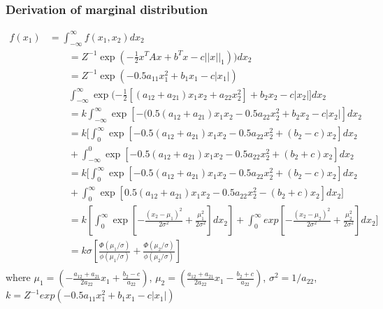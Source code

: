 \subsubsection{Derivation of marginal distribution}
$$
\begin{array}{rl}
	f(x_1)
	& =  \int_{-\infty}^{\infty} f(x_1,x_2)dx_2 \\
	& \qquad
	= Z^{-1}\exp(-\frac{1}{2}x^TAx + b^Tx - c||x||_1))dx_2 \\
	& \qquad
	= Z^{-1}\exp(-0.5a_{11}x_1^2  + b_1x_1 - c|x_1|) \\
	& \qquad
	\int_{-\infty}^{\infty}\exp(-\frac{1}{2} [(a_{12}+a_{21})x_1x_2 + a_{22}x_2^2] + b_2x_2 - c|x_2|]dx_2\\
	& \qquad
	= k \int_{-\infty}^{\infty} \exp[-(0.5(a_{12}+a_{21})x_1x_2 -0.5a_{22}x_2^2 + b_2x_2 - c|x_2|]dx_2\\
	& \qquad
	= k[ \int_{0}^{\infty} \exp[-0.5(a_{12}+a_{21})x_1x_2 - 0.5a_{22}x_2^2 + (b_2 - c)x_2 ]dx_2  \\
	& \qquad
	+\int_{-\infty}^{0} \exp[-0.5(a_{12}+a_{21})x_1x_2  - 0.5a_{22}x_2^2  + (b_2+c)x_2]dx_2 \\
	& \qquad
	= k[ \int_{0}^{\infty} \exp[-0.5(a_{12}+a_{21})x_1x_2 - 0.5a_{22}x_2^2 + (b_2 - c)x_2 ]dx_2  \\
	& \qquad
	+\int_{0}^{\infty} \exp[0.5(a_{12}+a_{21})x_1x_2  - 0.5a_{22}x_2^2  - (b_2+ c)x_2]dx_2 ]\\
	& \qquad
	= k[\int_{0}^{\infty} \exp[-\frac{(x_2-\mu_1)^2}{2\sigma^2} + \frac{\mu_1^2}{2\sigma^2}]dx_2] + \int_{0}^{\infty} exp[-\frac{(x_2-\mu_2)^2}{2\sigma^2} + \frac{\mu_2^2}{2\sigma^2}]dx_2] \\
	& \qquad
	= k \sigma[\frac{\Phi(\mu_1/\sigma)}{\phi(\mu_1/\sigma)} +
	\frac{\Phi(\mu_2/\sigma)}{\phi(\mu_2/\sigma)}]  \\
	
\end{array}
$$
where $\mu_1 = (-\frac{a_{12}+a_{21}}{2a_{22}}x_1 + \frac{b_2-c}{a_{22}}) $, $\mu_2 =(\frac{a_{12}+a_{21}}{2a_{22}}x_1 - \frac{b_2+c}{a_{22}}) $, $\sigma^2 = 1/a_{22}$, $k =  Z^{-1}exp(-0.5a_{11}x_1^2 + b_1x_1 - c|x_1|)$

